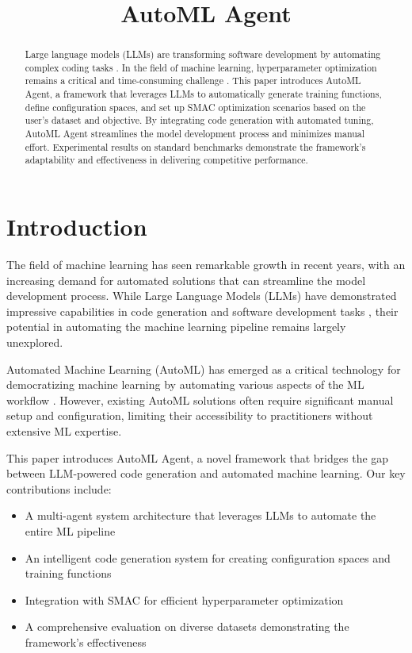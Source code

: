 \documentclass[11pt]{article}
\title{AutoML Agent}
\author[1]{\nameemail{Amirreza Alasti}{amirreza.alasti@stud.uni-hannover.de}}
\author[1,2]{\nameemail{Dr. rer. nat. Marcel Wever}{email2@example.com}}
\affil[1]{Leibniz University Hannover}
\affil[2]{Leibniz AI Academy}
\begin{document}
\maketitle

\begin{abstract}
Large language models (LLMs) are transforming software development by automating complex coding tasks \cite{hou2024largelanguagemodelssoftware}. In the field of machine learning, hyperparameter optimization remains a critical and time-consuming challenge \cite{He_2021}. This paper introduces AutoML Agent, a framework that leverages LLMs to automatically generate training functions, define configuration spaces, and set up SMAC optimization scenarios based on the user's dataset and objective. By integrating code generation with automated tuning, AutoML Agent streamlines the model development process and minimizes manual effort. Experimental results on standard benchmarks demonstrate the framework's adaptability and effectiveness in delivering competitive performance.
\end{abstract}

\section{Introduction}
The field of machine learning has seen remarkable growth in recent years, with an increasing demand for automated solutions that can streamline the model development process. While Large Language Models (LLMs) have demonstrated impressive capabilities in code generation and software development tasks \citep{hou2024largelanguagemodelssoftware}, their potential in automating the machine learning pipeline remains largely unexplored.

Automated Machine Learning (AutoML) has emerged as a critical technology for democratizing machine learning by automating various aspects of the ML workflow \citep{He_2021}. However, existing AutoML solutions often require significant manual setup and configuration, limiting their accessibility to practitioners without extensive ML expertise.

This paper introduces AutoML Agent, a novel framework that bridges the gap between LLM-powered code generation and automated machine learning. Our key contributions include:

\begin{itemize}
    \item A multi-agent system architecture that leverages LLMs to automate the entire ML pipeline
    \item An intelligent code generation system for creating configuration spaces and training functions
    \item Integration with SMAC \cite{lindauer2022smac3versatilebayesianoptimization} for efficient hyperparameter optimization
    \item A comprehensive evaluation on diverse datasets demonstrating the framework's effectiveness
\end{itemize}
\end{document}
